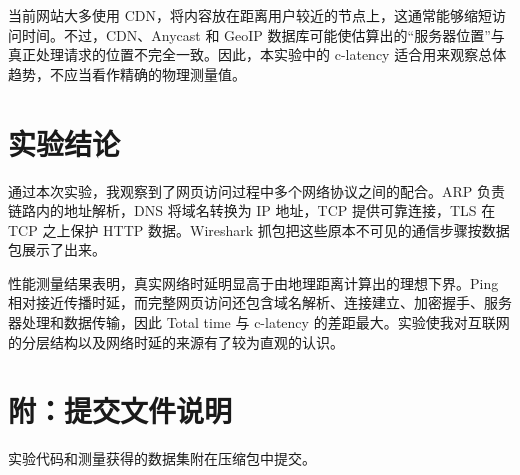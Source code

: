 \documentclass[UTF8,12pt,a4paper,fontset=fandol]{ctexart}
\begin{document}
当前网站大多使用 CDN，将内容放在距离用户较近的节点上，这通常能够缩短访问时间。不过，CDN、Anycast 和 GeoIP 数据库可能使估算出的“服务器位置”与真正处理请求的位置不完全一致。因此，本实验中的 c-latency 适合用来观察总体趋势，不应当看作精确的物理测量值。

\section{实验结论}

通过本次实验，我观察到了网页访问过程中多个网络协议之间的配合。ARP 负责链路内的地址解析，DNS 将域名转换为 IP 地址，TCP 提供可靠连接，TLS 在 TCP 之上保护 HTTP 数据。Wireshark 抓包把这些原本不可见的通信步骤按数据包展示了出来。

性能测量结果表明，真实网络时延明显高于由地理距离计算出的理想下界。Ping 相对接近传播时延，而完整网页访问还包含域名解析、连接建立、加密握手、服务器处理和数据传输，因此 Total time 与 c-latency 的差距最大。实验使我对互联网的分层结构以及网络时延的来源有了较为直观的认识。

\section*{附：提交文件说明}

实验代码和测量获得的数据集附在压缩包中提交。
\end{document}
